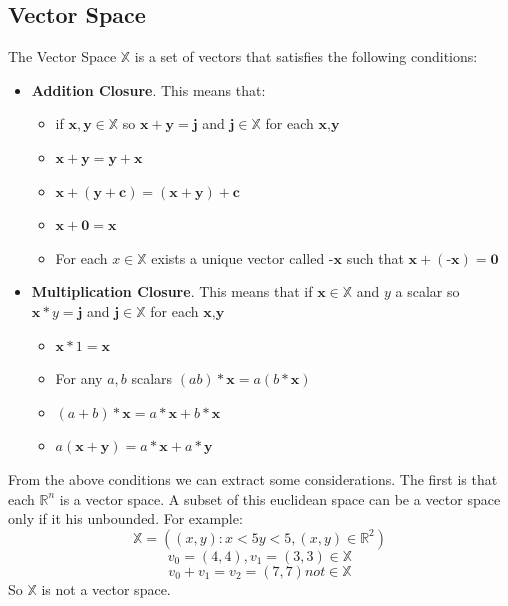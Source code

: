 \documentclass[12pt,a4paper,twoside,openright]{scrbook}
\begin{document}
\subsection{Vector Space}
The Vector Space $\mathbb{X}$ is a set of vectors that satisfies the following conditions:
\begin{itemize}
\item \textbf{Addition Closure}. This means that:
\begin{itemize}
 \item if $\textbf{x}, \textbf{y} \in \mathbb{X}$ so $\textbf{x} + \textbf{y} = \textbf{j}$ and $\textbf{j} \in \mathbb{X}$ for each $\textbf{x,y}$
 \item  $\textbf{x} + \textbf{y} = \textbf{y} + \textbf{x}$
 \item  $\textbf{x} + (\textbf{y} + \textbf{c}) = (\textbf{x} + \textbf{y}) + \textbf{c}$
 \item $\textbf{x} + \textbf{0} = \textbf{x}$
 \item For each $x \in \mathbb{X}$ exists a unique vector called $\textbf{-x}$ such that $\textbf{x} + (\textbf{-x}) = \textbf{0}$
 \end{itemize} 
\item \textbf{Multiplication Closure}. This means that if $\textbf{x} \in \mathbb{X}$ and $y$ a scalar so $\textbf{x} * y = \textbf{j}$ and $\textbf{j} \in \mathbb{X}$ for each $\textbf{x,y}$ \begin{itemize}
\item $\textbf{x} * 1 = \textbf{x}$
\item For any $a, b$ scalars $(ab)*\textbf{x} = a(b*\textbf{x})$
\item $(a + b)*\textbf{x} = a*\textbf{x} + b*\textbf{x}$
\item $a(\textbf{x} + \textbf{y}) = a*\textbf{x} + a*\textbf{y}$
\end{itemize}
\end{itemize}

From the above conditions we can extract some considerations. The first is that each $\mathbb{R}^n$ is a vector space. A subset of this euclidean space can be a vector space only if it his unbounded. For example:
\newline
\[ \mathbb{X} = ( (x,y) : x < 5  y < 5, (x,y) \in \mathbb{R}^2)\] \newline \[
v_0 = (4,4), v_1 = (3,3) \in \mathbb{X}\] \newline \[
v_0 + v_1 = v_2 = (7,7) not \in \mathbb{X}
\]
So $\mathbb{X}$ is not a vector space.
\end{document}

